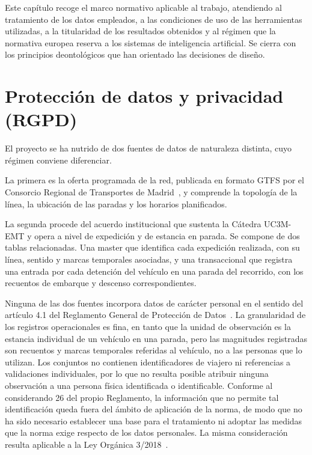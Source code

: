 Este capítulo recoge el marco normativo aplicable al trabajo, atendiendo al tratamiento
de los datos empleados, a las condiciones de uso de las herramientas utilizadas, a la
titularidad de los resultados obtenidos y al régimen que la normativa europea reserva a
los sistemas de inteligencia artificial. Se cierra con los principios deontológicos que han
orientado las decisiones de diseño.

\section{Protección de datos y privacidad (RGPD)}

El proyecto se ha nutrido de dos fuentes de datos de naturaleza distinta, cuyo régimen
conviene diferenciar.

La primera es la oferta programada de la red, publicada en formato GTFS por el Consorcio
Regional de Transportes de Madrid~\cite{crtm_gtfs}, y comprende la topología de la línea,
la ubicación de las paradas y los horarios planificados.

La segunda procede del acuerdo institucional que sustenta la Cátedra UC3M-EMT y opera a
nivel de expedición y de estancia en parada. Se compone de dos tablas relacionadas. Una master que
identifica cada expedición realizada, con su línea, sentido y marcas temporales asociadas,
y una transaccional que registra una entrada por cada detención del vehículo en una parada del
recorrido, con los recuentos de embarque y descenso correspondientes.

Ninguna de las dos fuentes incorpora datos de carácter personal en el sentido del artículo
4.1 del Reglamento General de Protección de Datos~\cite{rgpd}. La granularidad de los
registros operacionales es fina, en tanto que la unidad de observación es la estancia
individual de un vehículo en una parada, pero las magnitudes registradas son recuentos y
marcas temporales referidas al vehículo, no a las personas que lo utilizan. Los conjuntos no
contienen identificadores de viajero ni referencias a validaciones individuales, por lo que
no resulta posible atribuir ninguna observación a una persona física identificada o
identificable. Conforme al considerando 26 del propio Reglamento, la información que no
permite tal identificación queda fuera del ámbito de aplicación de la norma, de modo que no
ha sido necesario establecer una base para el tratamiento ni adoptar las medidas que la norma
exige respecto de los datos personales. La misma consideración resulta aplicable a la Ley
Orgánica 3/2018~\cite{lopdgdd}.

